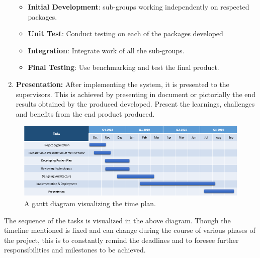 \begin{enumerate}
		\begin{itemize}
		\item\textbf{Initial Development}: sub-groups working independently on respected packages.
		\item\textbf{Unit Test}: Conduct testing on each of the packages developed
		\item\textbf{Integration}: Integrate work of all the sub-groups.
		\item\textbf{Final Testing}: Use benchmarking and test the final product. 	
	\end{itemize}


	\item \textbf{Presentation:}
	After implementing the system, it is presented to the supervisors. This is achieved by presenting in document or pictorially the end results obtained by the produced developed. Present the learnings, challenges and benefits from the end product produced. 
	\end{enumerate}

\begin{figure}[h]
\centering
\includegraphics[scale=.6]{timeplan}
\caption{A gantt diagram visualizing the time plan.}
\end{figure}
The sequence of the tasks is visualized in the above diagram. Though the timeline mentioned is fixed and can change during the course of various phases of the project, this is to constantly remind the deadlines and to foresee further responsibilities and milestones to be achieved. 


	